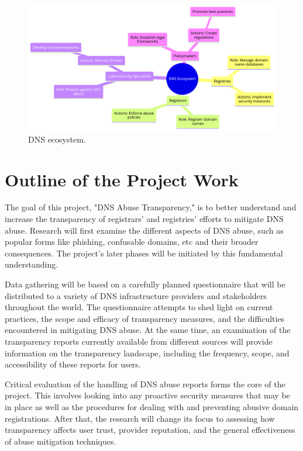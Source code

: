 \begin{figure}[H]
    \centering
    \includegraphics[width=\linewidth]{introduction/diagram (8).png}
    \caption{ DNS ecosystem.}
    \label{fig:dnsintrointro}
\end{figure}

\section{ Outline of the Project Work} 
The goal of this project, "DNS Abuse Transparency," is to better understand and increase the transparency of registrars' and registries' efforts to mitigate DNS abuse. Research will first examine the different aspects of DNS abuse, such as popular forms like phishing, confusable domains, etc and their broader consequences. The project's later phases will be initiated by this fundamental understanding.

Data gathering will be based on a carefully planned questionnaire that will be distributed to a variety of DNS infrastructure providers and stakeholders throughout the world. The questionnaire attempts to shed light on current practices, the scope and efficacy of transparency measures, and the difficulties encountered in mitigating DNS abuse. At the same time, an examination of the transparency reports currently available from different sources will provide information on the transparency landscape, including the frequency, scope, and accessibility of these reports for users.

Critical evaluation of the handling of DNS abuse reports forms the core of the project. This involves looking into any proactive security measures that may be in place as well as the procedures for dealing with and preventing abusive domain registrations. After that, the research will change its focus to assessing how transparency affects user trust, provider reputation, and the general effectiveness of abuse mitigation techniques.

